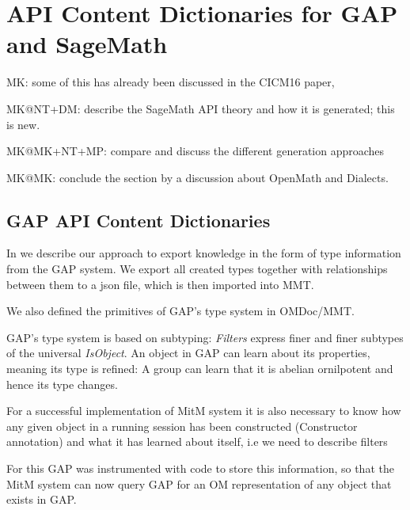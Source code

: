 \section{API Content Dictionaries for GAP and SageMath}\label{sec:apit}
\begin{todolist}{MK: some of this has already been discussed in the CICM16 paper, }
\item MK@NT+DM: describe the SageMath API theory and how it is generated; this is
  new. 
\item MK@MK+NT+MP: compare and discuss the different generation approaches
\item MK@MK: conclude the section by a discussion about OpenMath and Dialects.
\end{todolist}


\subsection{GAP API Content Dictionaries}

In \cite{DehKohKon:iop16} we describe our approach to export knowledge in the form of type information from the GAP system. 
We export all created types together with relationships between them to a json file, which is then imported into MMT.

We also defined the primitives of GAP's type system in OMDoc/MMT.

GAP's type system is based on subtyping: \emph{Filters} express finer and finer subtypes of the universal \emph{IsObject}.
An object in GAP can learn about its properties, meaning its type is refined: A group can learn that it is abelian ornilpotent and hence its type changes.

For a successful implementation of MitM system it is also necessary to know how any given object in a running session has been constructed (Constructor annotation) and what it has learned about itself, i.e we need to describe filters

For this GAP was instrumented with code to store this information, so that the MitM system can now query GAP for an OM representation of any object that exists in GAP.  

